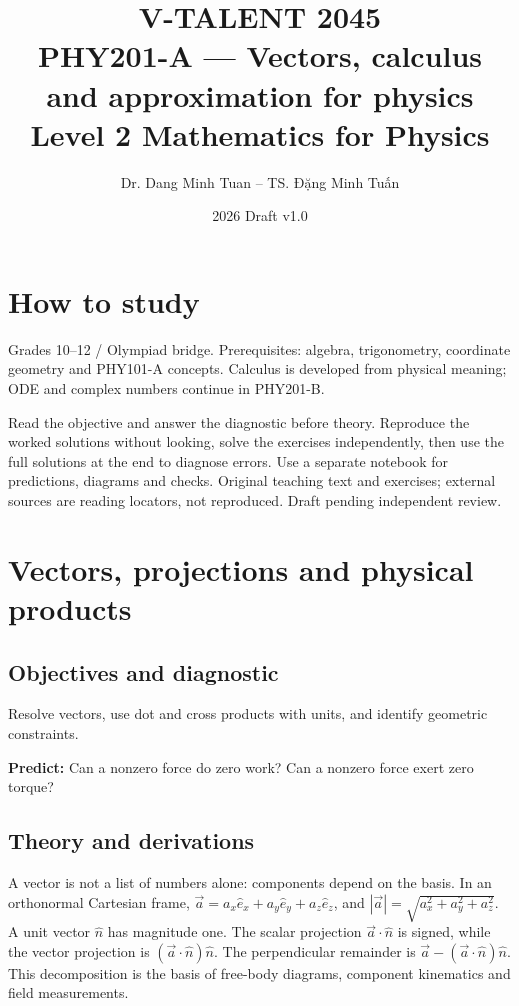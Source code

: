 \documentclass[11pt,a4paper,openany]{book}
\begin{document}
\title{V-TALENT 2045\\ PHY201-A --- Vectors, calculus and approximation for physics\\\large Level 2 \textbar{} Mathematics for Physics}
\author{Dr. Dang Minh Tuan -- TS. Đặng Minh Tuấn}
\date{2026 \textbar{} Draft v1.0}
\maketitle
\tableofcontents
\chapter*{How to study}
Grades 10–12 / Olympiad bridge. Prerequisites: algebra, trigonometry, coordinate geometry and PHY101-A concepts. Calculus is developed from physical meaning; ODE and complex numbers continue in PHY201-B.

Read the objective and answer the diagnostic before theory. Reproduce the worked solutions without looking, solve the exercises independently, then use the full solutions at the end to diagnose errors. Use a separate notebook for predictions, diagrams and checks. Original teaching text and exercises; external sources are reading locators, not reproduced. Draft pending independent review.
\chapter{Vectors, projections and physical products}
\section{Objectives and diagnostic}
Resolve vectors, use dot and cross products with units, and identify geometric constraints.

\textbf{Predict:} Can a nonzero force do zero work? Can a nonzero force exert zero torque?
\section{Theory and derivations}
A vector is not a list of numbers alone: components depend on the basis. In an orthonormal Cartesian frame, $\vec a=a_x\hat e_x+a_y\hat e_y+a_z\hat e_z$, and $|\vec a|=\sqrt{a_x^2+a_y^2+a_z^2}$. A unit vector $\hat n$ has magnitude one. The scalar projection $\vec a\cdot\hat n$ is signed, while the vector projection is $(\vec a\cdot\hat n)\hat n$. The perpendicular remainder is $\vec a-(\vec a\cdot\hat n)\hat n$. This decomposition is the basis of free-body diagrams, component kinematics and field measurements.
\end{document}
